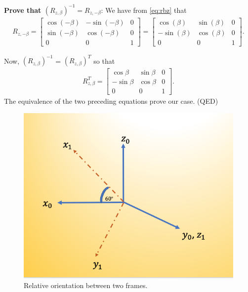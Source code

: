 \begin{solution}
\noindent \textbf{Prove that ${(R_{z, \beta})}^{-1} = R_{z, -\beta}$}:
%
We have from \eqref{eq:rbz} that
%
\begin{align}
R_{z, -\beta} = \begin{bmatrix}
\cos(-\beta )& -\sin (-\beta)    &  0  \\
%
\sin (-\beta)    &  \cos (-\beta)   &  0 \\
%
0 &  0  &  1 
\end{bmatrix} = \begin{bmatrix}
\cos(\beta )& \sin (\beta)    &  0  \\
%
-\sin (\beta)    &  \cos (\beta)   &  0 \\
%
0 &  0  &  1 
\end{bmatrix}.
\end{align}

Now, $(R_{z, \beta})^{-1}$ = $(R_{z, \beta})^T$ so that 
%
\begin{align}
	R_{z, \beta}^T = \begin{bmatrix}
	\cos \beta & \sin \beta    &  0  \\
	-\sin \beta    &  \cos \beta   &  0 \\
	0 &  0  &  1 
	\end{bmatrix}.
\end{align}
%
The equivalence of the two preceding equations prove our case. (QED)
\end{solution}

\begin{figure}[tb!]
	\centering
	\includegraphics[width=.8\columnwidth]{../lec_notes/figures/two_frames.png}
	\caption{Relative orientation between two frames.}
	\label{fig:two_frames}
\end{figure}


